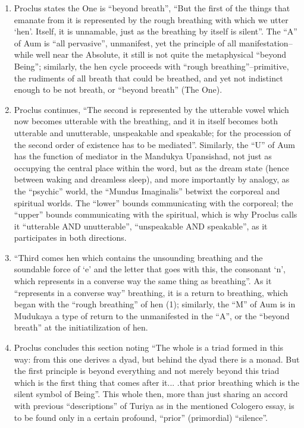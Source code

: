 \begin{enumerate}
\item Proclus states the One is ``beyond breath'', ``But the first of the things that emanate from it is represented by the rough breathing with which we utter `hen'. Itself, it is unnamable, just as the breathing by itself is silent''. The ``A'' of Aum is ``all pervasive'', unmanifest, yet the principle of all manifestation--while well near the Absolute, it still is not quite the metaphysical ``beyond Being''; similarly, the hen cycle proceeds with ``rough breathing''--primitive, the rudiments of all breath that could be breathed, and yet not indistinct enough to be not breath, or ``beyond breath'' (The One).

\item Proclus continues, ``The second is represented by the utterable vowel which now becomes utterable with the breathing, and it in itself becomes both utterable and unutterable, unspeakable and speakable; for the procession of the second order of existence has to be mediated''. Similarly, the ``U'' of Aum has the function of mediator in the Mandukya Upansishad, not just as occupying the central place within the word, but as the dream state (hence between waking and dreamless sleep), and more importantly by analogy, as the ``psychic'' world, the ``Mundus Imaginalis'' betwixt the corporeal and spiritual worlds. The ``lower'' bounds communicating with the corporeal; the ``upper'' bounds communicating with the spiritual, which is why Proclus calls it ``utterable AND unutterable'', ``unspeakable AND speakable'', as it participates in both directions.

\item ``Third comes hen which contains the unsounding breathing and the soundable force of `e' and the letter that goes with this, the consonant `n', which represents in a converse way the same thing as breathing''. As it ``represents in a converse way'' breathing, it is a return to breathing, which began with the ``rough breathing'' of hen (1); similarly, the ``M'' of Aum is in Mudukaya a type of return to the unmanifested in the ``A'', or the ``beyond breath'' at the initiatilization of hen.

\item Proclus concludes this section noting ``The whole is a triad formed in this way: from this one derives a dyad, but behind the dyad there is a monad. But the first principle is beyond everything and not merely beyond this triad which is the first thing that comes after it... .that prior breathing which is the silent symbol of Being''. This whole then, more than just sharing an accord with previous ``descriptions'' of Turiya as in the mentioned Cologero essay, is to be found only in a certain profound, ``prior'' (primordial) ``silence''.
\end{enumerate}


